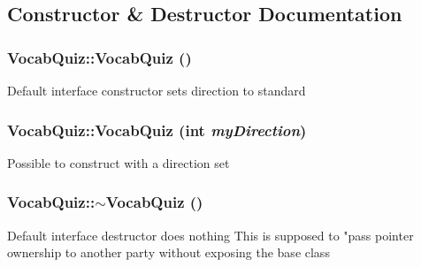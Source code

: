 \subsection{Constructor \& Destructor Documentation}
\hypertarget{classVocabQuiz_aa9f188fd46b6bfd21c8e1e3d5883d350}{
\subsubsection[{VocabQuiz}]{\setlength{\rightskip}{0pt plus 5cm}VocabQuiz::VocabQuiz ()}}
\label{classVocabQuiz_aa9f188fd46b6bfd21c8e1e3d5883d350}
Default interface constructor sets direction to standard \hypertarget{classVocabQuiz_a7c0575b4418431675956078c9b403166}{
\subsubsection[{VocabQuiz}]{\setlength{\rightskip}{0pt plus 5cm}VocabQuiz::VocabQuiz (int {\em myDirection})}}
\label{classVocabQuiz_a7c0575b4418431675956078c9b403166}
Possible to construct with a direction set \hypertarget{classVocabQuiz_a55c4c64161cc8e22643b0daa8dcf95a4}{
\subsubsection[{$\sim$VocabQuiz}]{\setlength{\rightskip}{0pt plus 5cm}VocabQuiz::$\sim$VocabQuiz ()}}
\label{classVocabQuiz_a55c4c64161cc8e22643b0daa8dcf95a4}
Default interface destructor does nothing This is supposed to "pass pointer ownership to another party without exposing the base class 

